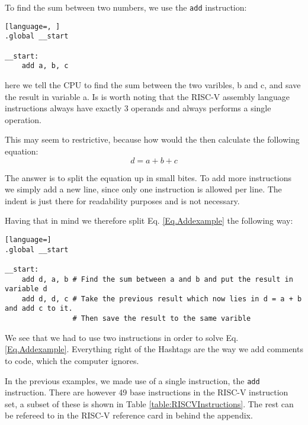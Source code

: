     To find the sum between two numbers, we use the \texttt{add} instruction:
    \begin{lstlisting}[language=, ]
.global __start

__start:
    add a, b, c
    \end{lstlisting}
    here we tell the CPU to find the sum between the two varibles, b and c, and save the result in variable a. Is is worth noting that the RISC-V assembly language instructions always have exactly 3 operands and always performs a single operation.
    
    This may seem to restrictive, because how would the then calculate the following equation:
    \begin{equation}\label{Eq.Addexample}
        d = a + b + c
    \end{equation}
    
    The answer is to split the equation up in small bites. To add more instructions we simply add a new line, since only one instruction is allowed per line. The indent is just there for readability purposes and is not necessary. 
    
    Having that in mind we therefore split Eq. \ref{Eq.Addexample} the following way:
    \begin{lstlisting}[language=]
.global __start

__start:
    add d, a, b # Find the sum between a and b and put the result in variable d
    add d, d, c # Take the previous result which now lies in d = a + b and add c to it. 
                # Then save the result to the same varible 
    \end{lstlisting}
    We see that we had to use two instructions in order to solve Eq. \ref{Eq.Addexample}. Everything right of the Hashtags are the way we add comments to code, which the computer ignores.
    
    In the previous examples, we made use of a single instruction, the \texttt{add} instruction. There are however 49 base instructions in the RISC-V instruction set, a subset of these is shown in Table \ref{table:RISCVInstructions}. The rest can be refereed to in the RISC-V reference card in behind the appendix.   

